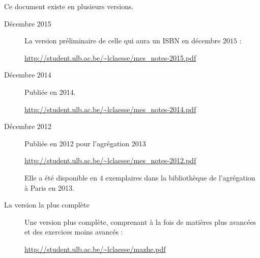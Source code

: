 
\thispagestyle{empty}

Ce document existe en plusieurs versions.
\begin{description}
    \item[Décembre 2015]

        La version préliminaire de celle qui aura un ISBN en décembre $2015$ :
        \begin{center}
            \url{http://student.ulb.ac.be/~lclaesse/mes_notes-2015.pdf}
        \end{center}

    \item[Décembre 2014] 

        Publiée en 2014.
        \begin{center}
        \url{http://student.ulb.ac.be/~lclaesse/mes_notes-2014.pdf}
        \end{center}

        
    \item[Décembre 2012]

        Publiée en 2012 pour l'agrégation 2013
        \begin{center}
        \url{http://student.ulb.ac.be/~lclaesse/mes_notes-2012.pdf}
        \end{center}

        Elle a été disponible en \( 4\) exemplaires dans la bibliothèque de l'agrégation à Paris en 2013. 

    \item[La version la plus complète]

        Une version plus complète, comprenant à la fois de matières plus avancées et des exercices moins avancés : 
        \begin{center}
        \url{http://student.ulb.ac.be/~lclaesse/mazhe.pdf}
        \end{center}

\end{description}


\vfill

\LogoEtLicence
\clearpage
